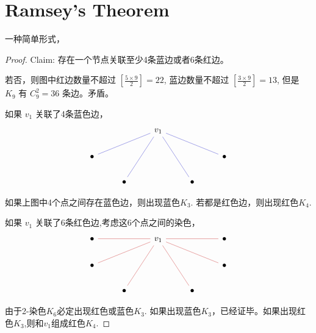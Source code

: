 \documentclass[oneside]{book}
\begin{document}
\section{Ramsey's Theorem}

一种简单形式，
\begin{proof}
    Claim: 存在一个节点关联至少4条蓝边或者6条红边。

    若否，则图中红边数量不超过 $[\frac{5 \times 9}{2}] = 22$, 蓝边数量不超过 $[\frac{3\times 9}{2}] = 13$, 但是 $K_9$ 有 $C_9^2 = 36$ 条边。矛盾。

    如果 $v_1$ 关联了4条蓝色边，
    \[\begin{tikzcd}
        && {v_1} \\
        \bullet &&&& \bullet \\
        & \bullet && \bullet
        \arrow[color={rgb,255:red,92;green,92;blue,214}, no head, from=1-3, to=2-1]
        \arrow[color={rgb,255:red,92;green,92;blue,214}, no head, from=1-3, to=2-5]
        \arrow[color={rgb,255:red,92;green,92;blue,214}, no head, from=1-3, to=3-2]
        \arrow[color={rgb,255:red,92;green,92;blue,214}, no head, from=1-3, to=3-4]
    \end{tikzcd}\]

    如果上图中4个点之间存在蓝色边，则出现蓝色$K_3$. 若都是红色边，则出现红色$K_4$.

    如果 $v_1$ 关联了6条红色边,考虑这6个点之间的染色，
    \[\begin{tikzcd}
        \bullet && {v_1} && \bullet \\
        \bullet &&&& \bullet \\
        & \bullet && \bullet
        \arrow[color={rgb,255:red,214;green,92;blue,92}, no head, from=1-1, to=1-3]
        \arrow[color={rgb,255:red,214;green,92;blue,92}, no head, from=1-3, to=1-5]
        \arrow[color={rgb,255:red,214;green,92;blue,92}, no head, from=1-3, to=2-1]
        \arrow[color={rgb,255:red,214;green,92;blue,92}, no head, from=1-3, to=2-5]
        \arrow[color={rgb,255:red,214;green,92;blue,92}, no head, from=1-3, to=3-2]
        \arrow[color={rgb,255:red,214;green,92;blue,92}, no head, from=1-3, to=3-4]
    \end{tikzcd}\]
    
    由于2-染色$K_6$必定出现红色或蓝色$K_3$. 如果出现蓝色$K_3$，已经证毕。如果出现红色$K_3$,则和$v_1$组成红色$K_4$.
\end{proof}
\end{document}

